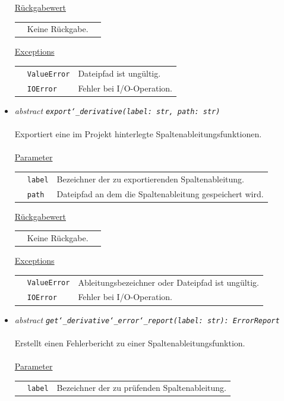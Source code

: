 \documentclass{article}
\begin{document}
\begin{itemize}
\underline{Rückgabewert}\\
\begin{tabular}{lll}
 & Keine Rückgabe.\\
\end{tabular}

\underline{Exceptions}\\
\begin{tabular}{lll}
 & \texttt{ValueError} & Dateipfad ist ungültig.\\
 & \texttt{IOError} & Fehler bei I/O-Operation.\\
\end{tabular}


\item \textit{\flqq{}abstract\frqq} \texttt{\textit{export\char`_derivative(label: str, path: str)}}\\\\
Exportiert eine im Projekt hinterlegte Spaltenableitungsfunktionen.
\\\\
\underline{Parameter}\\
\begin{tabular}{lll}
 & \texttt{label} & Bezeichner der zu exportierenden Spaltenableitung.\\
 & \texttt{path} & Dateipfad an dem die Spaltenableitung gespeichert wird.\\
\end{tabular}

\underline{Rückgabewert}\\
\begin{tabular}{lll}
 & Keine Rückgabe.\\
\end{tabular}

\underline{Exceptions}\\
\begin{tabular}{lll}
 & \texttt{ValueError} & Ableitungsbezeichner oder Dateipfad ist ungültig.\\
 & \texttt{IOError} & Fehler bei I/O-Operation.\\
\end{tabular}


\item \textit{\flqq{}abstract\frqq} \texttt{\textit{get\char`_derivative\char`_error\char`_report(label: str): ErrorReport}}\\\\
Erstellt einen Fehlerbericht zu einer Spaltenableitungsfunktion.
\\\\
\underline{Parameter}\\
\begin{tabular}{lll}
 & \texttt{label} & Bezeichner der zu prüfenden Spaltenableitung.\\
\end{tabular}


\end{itemize}
\end{document}
